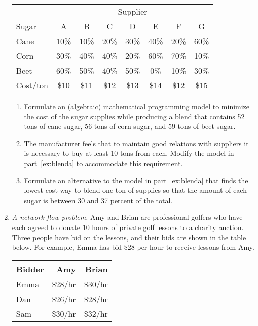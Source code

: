 \begin{enumerate}
\begin{center}
\begin{tabular}{lccccccc} \centering
 & \multicolumn{7}{c}{Supplier}\\
Sugar  &   A &  B &  C &  D &  E &  F &  G \\ \hline
Cane   &  10\% & 10\% & 20\% & 30\% & 40\% & 20\% & 60\% \\
Corn   &  30\% & 40\% & 40\% & 20\% & 60\% & 70\% & 10\% \\
Beet   &  60\% & 50\% & 40\% & 50\% &  0\% & 10\% & 30\% \\
Cost/ton& \$10 & \$11 & \$12 & \$13 & \$14 & \$12 & \$15
\end{tabular}
\end{center}

\begin{enumerate}
\item Formulate an (algebraic) mathematical programming model to minimize 
the cost of the sugar supplies while producing a blend that contains 52 tons
of cane sugar, 56 tons of corn sugar, and 59 tons of beet sugar. \label{ex:blenda}

\item The manufacturer feels that to maintain good relations with suppliers
it is necessary to buy at least 10 tons from each. Modify the model in
part~\ref{ex:blenda} to accommodate this requirement.

\item Formulate an alternative to the model in part~\ref{ex:blenda} that finds the 
lowest cost way to blend one ton of supplies so that the amount of each 
sugar is between 30 and 37 percent of the total.
\end{enumerate}

\item \emph{A network flow problem.}  Amy and Brian are professional
  golfers who have each agreed to donate 10 hours of private golf
  lessons to a charity auction. Three people have bid on the lessons,
  and their bids are shown in the table below. For example, Emma has
  bid \$28 per hour to receive lessons from Amy.

\begin{tabular}{lrr}
Bidder & Amy & Brian \\ \hline
Emma & \$28/hr & \$30/hr \\
Dan     & \$26/hr & \$28/hr \\
Sam  & \$30/hr & \$32/hr
\end{tabular}


\end{enumerate}
